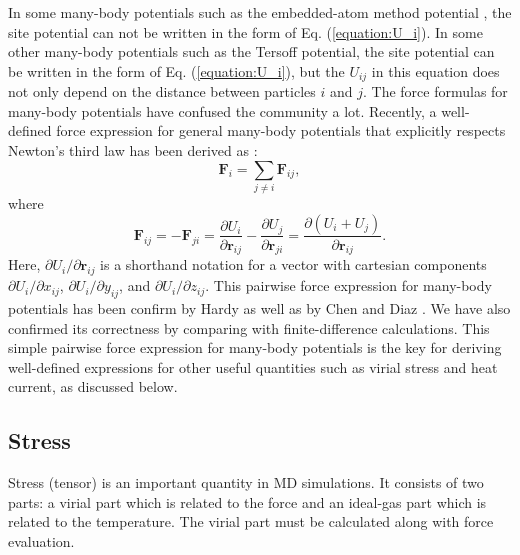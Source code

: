 \documentclass[12pt,a4paper]{report}
\newcommand{\vect}[1]{\boldsymbol{#1}}
\begin{document}
In some many-body potentials such as the embedded-atom method potential \cite{daw1984prb}, the site potential can not be written in the form of Eq. (\ref{equation:U_i}). In some other many-body potentials such as the Tersoff potential, the site potential can be written in the form of Eq. (\ref{equation:U_i}), but the $U_{ij}$ in this equation does not only depend on the distance between particles $i$ and $j$. The force formulas for many-body potentials have confused the community a lot. Recently, a well-defined force expression for general many-body potentials that explicitly respects Newton's third law  has been derived as \cite{fan2015prb}:
\begin{equation}
\vect{F}_{i} = \sum_{j \neq i} \vect{F}_{ij},
\end{equation}
where
\begin{equation}
\boxed{
\vect{F}_{ij} = - \vect{F}_{ji} =
\frac{\partial U_{i}}{\partial \vect{r}_{ij}} -
\frac{\partial U_{j}}{\partial \vect{r}_{ji}} =
\frac{\partial \left(U_{i} + U_{j}\right) }{\partial \vect{r}_{ij}}
}.
\end{equation}
Here, $\partial U_{i}/\partial \vect{r}_{ij}$ is a shorthand notation for a vector with cartesian components $\partial U_{i}/\partial x_{ij}$, $\partial U_{i}/\partial y_{ij}$, and $\partial U_{i}/\partial z_{ij}$. This pairwise force expression for many-body potentials has been confirm by Hardy \cite{hardy2016jcp} as well as by Chen and Diaz \cite{chen2016pre}. We have also confirmed its correctness by comparing with finite-difference calculations. This simple pairwise force expression for many-body potentials is the key for deriving well-defined expressions for other useful quantities such as virial stress and heat current, as discussed below.




\subsection{Stress}


Stress (tensor) is an important quantity in MD simulations. It consists of two parts: a virial part which is related to the force and an ideal-gas part which is related to the temperature. The virial part must be calculated along with force evaluation.
\end{document}

